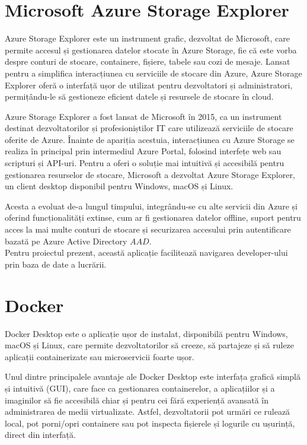 \section{Microsoft Azure Storage Explorer}
Azure Storage Explorer este un instrument grafic, dezvoltat de Microsoft, care permite
accesul și gestionarea datelor stocate în Azure Storage, fie că este vorba despre conturi de stocare,
containere, fișiere, tabele sau cozi de mesaje. Lansat pentru a simplifica interacțiunea cu serviciile
de stocare din Azure, Azure Storage Explorer oferă o interfață ușor de utilizat pentru dezvoltatori
și administratori, permițându-le să gestioneze eficient datele și resursele de stocare în cloud. \parencite{azureStorageExplorer}

Azure Storage Explorer a fost lansat de Microsoft în 2015, ca un instrument destinat
dezvoltatorilor și profesioniștilor IT care utilizează serviciile de stocare oferite de Azure. Înainte
de apariția acestuia, interacțiunea cu Azure Storage se realiza în principal prin intermediul Azure
Portal, folosind interfețe web sau scripturi și API-uri. Pentru a oferi o soluție mai intuitivă și
accesibilă pentru gestionarea resurselor de stocare, Microsoft a dezvoltat Azure Storage Explorer,
un client desktop disponibil pentru Windows, macOS și Linux. \parencite{azureStorageExplorer}

Acesta a evoluat de-a lungul timpului, integrându-se cu alte servicii din Azure și oferind
funcționalități extinse, cum ar fi gestionarea datelor offline, suport pentru acces la mai multe
conturi de stocare și securizarea accesului prin autentificare bazată pe Azure Active Directory
\(AAD\). \parencite{azureStorageExplorer}
\\Pentru proiectul prezent, această aplicație facilitează navigarea developer-ului prin baza de date a lucrării.

\section{Docker}

Docker Desktop este o aplicație ușor de instalat, disponibilă pentru Windows, macOS și Linux, care permite dezvoltatorilor să creeze, să partajeze și să ruleze aplicații containerizate sau microservicii foarte ușor. \parencite{docker}

Unul dintre principalele avantaje ale Docker Desktop este interfața grafică simplă și intuitivă (GUI), care face ca gestionarea containerelor, a aplicațiilor și a imaginilor să fie accesibilă chiar și pentru cei fără experiență avansată în administrarea de medii virtualizate. Astfel, dezvoltatorii pot urmări ce rulează local, pot porni/opri containere sau pot inspecta fișierele și logurile cu ușurință, direct din interfață. \parencite{docker}

